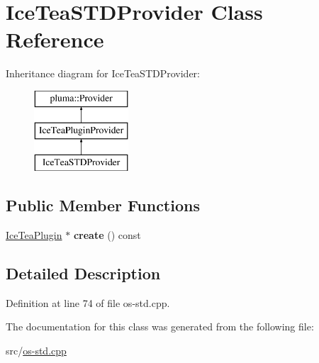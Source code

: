 \hypertarget{class_ice_tea_s_t_d_provider}{}\section{Ice\+Tea\+S\+T\+D\+Provider Class Reference}
\label{class_ice_tea_s_t_d_provider}
Inheritance diagram for Ice\+Tea\+S\+T\+D\+Provider\+:\begin{figure}[H]
\begin{center}
\leavevmode
\includegraphics[height=3.000000cm]{class_ice_tea_s_t_d_provider}
\end{center}
\end{figure}
\subsection*{Public Member Functions}
\begin{DoxyCompactItemize}
\item 
\hyperlink{class_ice_tea_plugin}{Ice\+Tea\+Plugin} $\ast$ {\bfseries create} () const \hypertarget{class_ice_tea_s_t_d_provider_ab8e8fddd0eb3f27c6227a4b64be89850}{}\label{class_ice_tea_s_t_d_provider_ab8e8fddd0eb3f27c6227a4b64be89850}

\end{DoxyCompactItemize}


\subsection{Detailed Description}


Definition at line 74 of file os-\/std.\+cpp.



The documentation for this class was generated from the following file\+:\begin{DoxyCompactItemize}
\item 
src/\hyperlink{os-std_8cpp}{os-\/std.\+cpp}\end{DoxyCompactItemize}
